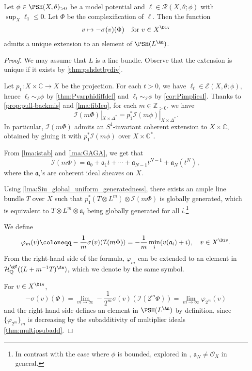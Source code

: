 \begin{proposition}\label{prop:PhiinducePSH}
Let $\phi\in \PSH(X,\theta)_{>0}$ be a model potential and $\ell\in \mathcal{R}(X,\theta;\phi)$ with $\sup_X \ell_1\leq 0$. Let $\Phi$ be the complexification of $\ell$. Then the function
\[
v\mapsto -\sigma(v)(\Phi) \quad \text{for } v\in X^{\Div}
\]
admits a unique extension to an element of $\PSH(L^{\An})$.
\end{proposition}
\begin{proof}
We may assume that $L$ is a line bundle. Observe that the extension is unique if it exists by \cref{thm:pshdetbydiv}.

Let $p_1\colon X\times \mathbb{C}\rightarrow X$ be the projection. For each $t>0$, we have $\ell_t\in \mathcal{E}(X,\theta;\phi)$, hence $\ell_t\sim_P\phi$ by \cref{thm:Pvarphidiffdef} and $\ell_t\sim_{\mathcal{I}}\phi$ by \cref{cor:PimpliesI}. Thanks to \cref{prop:pull-backmis} and \cref{lma:fibIeq}, for each $m\in \mathbb{Z}_{>0}$, we have
\[
\mathcal{I}(m\Phi)|_{X\times \Delta^*} = p_1^* \mathcal{I}(m\phi)|_{X\times \Delta^*}.
\]
In particular, $\mathcal{I}(m\Phi)$ admits an $S^1$-invariant coherent extension to $X\times \mathbb{C}$, obtained by gluing it with $p_1^*\mathcal{I}(m\phi)$ over $X\times \mathbb{C}^*$.

From \cref{lma:istab} and \cref{lma:GAGA}, we get that
\begin{equation}\label{eq:ImPhiexp}
\mathcal{I}(m\Phi)=\mathfrak{a}_0 +\mathfrak{a}_1 t+\cdots+\mathfrak{a}_{N-1} t^{N-1}+\mathfrak{a}_N (t^N)\,,
\end{equation}
where the $\mathfrak{a}_i$'s are coherent ideal sheaves on $X$.

Using \cref{lma:Siu_global_uniform_generatedness}, there exists an ample line bundle $T$ over $X$ such that $p_1^* (T\otimes L^m)\otimes \mathcal{I}(m\Phi)$ is globally generated, which is equivalent to $T\otimes L^m\otimes \mathfrak{a}_i$ being globally generated for all $i$.\footnote{In contrast with the case where $\phi$ is bounded, explored in \cite{BBJ21}, $\mathfrak{a}_N \neq \mathcal{O}_X$ in general.}

We define
\[
\varphi_m(v)\coloneqq -\frac{1}{m}\sigma(v)(\mathcal{I}(m\Phi))=-\frac{1}{m}\min_i (v(\mathfrak{a}_i)+i),\quad v\in X^{\Div}.
\]
From the right-hand side of the formula, $\varphi_m$ can be extended to an element in $\mathcal{H}^{\gf}_{\mathbb{Q}}((L+m^{-1}T)^{\An})$, which we denote by the same symbol.

For $v\in X^{\Div}$,
\[
-\sigma(v)(\Phi)=\lim_{m\to\infty}-\frac{1}{2^m}\sigma(v)(\mathcal{I}(2^m\Phi))=\lim_{m\to\infty}\varphi_{2^m}(v)
\]
and the right-hand side defines an element in $\PSH(L^{\An})$ by definition, since $\{\varphi_{2^m}\}_m$ is decreasing by the subadditivity of multiplier ideals \cref{thm:multipsubadd}.
\end{proof}

